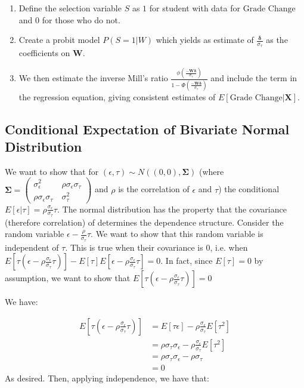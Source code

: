 \documentclass[12pt,twoside]{reedthesis}
\theoremstyle{definition}
\begin{document}
\begin{enumerate}
\item Define the selection variable $S$ as $1$ for student with data for $\text{Grade Change}$ and $0$ for those who do not.

\item Create a probit model $P(S=1 | W)$ which yields as estimate of $\frac{\boldsymbol{\delta}}{\sigma_\tau}$ as the coefficients on $\mathbf{W}$.

\item We then estimate the inverse Mill's ratio $\frac{\phi(\frac{-\mathbf{W} \boldsymbol{\delta}}{\sigma_\tau})}{1 - \Phi(\frac{-\mathbf{W} \boldsymbol{\delta}}{\sigma_\tau})}$ and include the term in the regression equation, giving consistent estimates of $E[\text{Grade Change} | \mathbf{X}]$.
\end{enumerate}


 
\subsection{Conditional Expectation of Bivariate Normal Distribution}

We want to show that for $(\epsilon, \tau) \sim N((0,0), \boldsymbol{\Sigma})$ (where $\boldsymbol{\Sigma} = \begin{pmatrix}
\sigma_\epsilon^2 &\ \rho \sigma_\epsilon \sigma_\tau \\
\rho \sigma_\epsilon \sigma_\tau &\ \sigma_\tau^2
\end{pmatrix}$ and $\rho$ is the correlation of $\epsilon$ and $\tau$) the conditional $E[\epsilon | \tau] = \rho \frac{\sigma_\epsilon}{\sigma_\tau} \tau$. The normal distribution has the property that the covariance (therefore correlation) of determines the dependence structure. Consider the random variable $\epsilon - \frac{\rho}{\sigma_\tau} \tau$. We want to show that this random variable is independent of $\tau$. This is true when their covariance is $0$, i.e. when $E[\tau (\epsilon -\rho \frac{\sigma_\epsilon}{\sigma_\tau}\tau)] - E[\tau] E[\epsilon - \rho \frac{\sigma_\epsilon}{\sigma_\tau}  \tau] = 0$. In fact, since $E[\tau]=0$ by assumption, we want to show that $E[\tau (\epsilon -\rho \frac{\sigma_\epsilon}{\sigma_\tau} \tau)] = 0$

We have:

\begin{align*}
E[\tau (\epsilon - \rho \frac{\sigma_\epsilon}{\sigma_\tau} \tau)] &= E[\tau \epsilon] -  \rho \frac{\sigma_\epsilon}{\sigma_\tau} E[\tau^2] \\
&=  \rho \sigma_\tau \sigma_\epsilon -  \rho \frac{\sigma_\epsilon}{\sigma_\tau}E[\tau^2] \\ 
&= \rho \sigma_\tau \sigma_\epsilon -  \rho \sigma_\tau \\
&= 0
\end{align*}
As desired. Then, applying independence, we have that:
\end{document}
